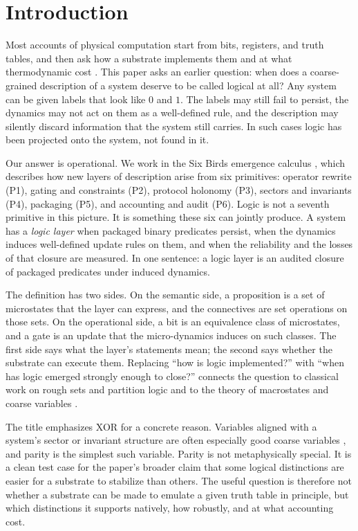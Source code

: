 \section{Introduction}
\label{sec:introduction}

Most accounts of physical computation start from bits, registers, and truth tables, and then ask how a substrate implements them and at what thermodynamic cost \cite{landauer1961,bennett1973,fredkintoffoli1982conservative,bennett1982thermodynamics}. This paper asks an earlier question: when does a coarse-grained description of a system deserve to be called logical at all? Any system can be given labels that look like \(0\) and \(1\). The labels may still fail to persist, the dynamics may not act on them as a well-defined rule, and the description may silently discard information that the system still carries. In such cases logic has been projected onto the system, not found in it.

Our answer is operational. We work in the Six Birds emergence calculus \cite{tsiokos2026sixbirds}, which describes how new layers of description arise from six primitives: operator rewrite (P1), gating and constraints (P2), protocol holonomy (P3), sectors and invariants (P4), packaging (P5), and accounting and audit (P6). Logic is not a seventh primitive in this picture. It is something these six can jointly produce. A system has a \emph{logic layer} when packaged binary predicates persist, when the dynamics induces well-defined update rules on them, and when the reliability and the losses of that closure are measured. In one sentence: a logic layer is an audited closure of packaged predicates under induced dynamics.

The definition has two sides. On the semantic side, a proposition is a set of microstates that the layer can express, and the connectives are set operations on those sets. On the operational side, a bit is an equivalence class of microstates, and a gate is an update that the micro-dynamics induces on such classes. The first side says what the layer's statements mean; the second says whether the substrate can execute them. Replacing ``how is logic implemented?'' with ``when has logic emerged strongly enough to close?'' connects the question to classical work on rough sets and partition logic \cite{pawlak1982rough,ellerman2010partitions} and to the theory of macrostates and coarse variables \cite{shalizi2025macrostate}.

The title emphasizes XOR for a concrete reason. Variables aligned with a system's sector or invariant structure are often especially good coarse variables \cite{simonando1961aggregation,shalizi2025macrostate,barnettseth2023dynamical}, and parity is the simplest such variable. Parity is not metaphysically special. It is a clean test case for the paper's broader claim that some logical distinctions are easier for a substrate to stabilize than others. The useful question is therefore not whether a substrate can be made to emulate a given truth table in principle, but which distinctions it supports natively, how robustly, and at what accounting cost.

